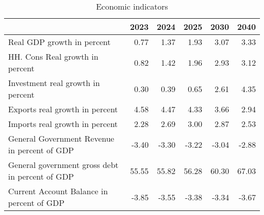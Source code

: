 \documentclass{article}
\begin{document}
\begin{table}
\caption{Economic indicators}
\begin{tabular}{lrrrrr}
\toprule
 & 2023 & 2024 & 2025 & 2030 & 2040 \\
\midrule
Real GDP growth in percent & 0.77  & 1.37  & 1.93  & 3.07  & 3.33  \\
HH. Cons Real growth in percent & 0.82  & 1.42  & 1.96  & 2.93  & 3.12  \\
Investment real growth in percent & 0.30  & 0.39  & 0.65  & 2.61  & 4.35  \\
Exports real growth in percent & 4.58  & 4.47  & 4.33  & 3.66  & 2.94  \\
Imports real growth in percent & 2.28  & 2.69  & 3.00  & 2.87  & 2.53  \\
General Government Revenue in percent of GDP & -3.40  & -3.30  & -3.22  & -3.04  & -2.88  \\
General government gross debt  in percent of GDP & 55.55  & 55.82  & 56.28  & 60.30  & 67.03  \\
Current Account Balance in percent of GDP & -3.85  & -3.55  & -3.38  & -3.34  & -3.67  \\
\bottomrule
\end{tabular}
\end{table}
\end{document}

